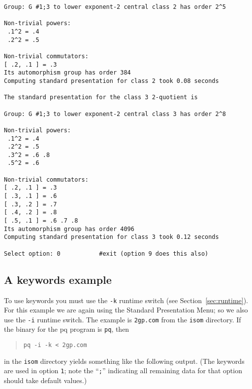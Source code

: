 \documentclass[12pt]{article}
\begin{document}
\begin{verbatim}
Group: G #1;3 to lower exponent-2 central class 2 has order 2^5

Non-trivial powers:
 .1^2 = .4
 .2^2 = .5

Non-trivial commutators:
[ .2, .1 ] = .3
Its automorphism group has order 384
Computing standard presentation for class 2 took 0.08 seconds

The standard presentation for the class 3 2-quotient is

Group: G #1;3 to lower exponent-2 central class 3 has order 2^8

Non-trivial powers:
 .1^2 = .4
 .2^2 = .5
 .3^2 = .6 .8
 .5^2 = .6

Non-trivial commutators:
[ .2, .1 ] = .3
[ .3, .1 ] = .6
[ .3, .2 ] = .7
[ .4, .2 ] = .8
[ .5, .1 ] = .6 .7 .8
Its automorphism group has order 4096
Computing standard presentation for class 3 took 0.12 seconds

Select option: 0           #exit (option 9 does this also)
\end{verbatim}

\subsection{A keywords example}

To use keywords you must use the \texttt{-k} runtime switch
(see Section~\ref{sec:runtime}). For this example we are again
using the Standard Presentation Menu; so we also use the \texttt{-i} runtime
switch. The example is \verb|2gp.com| from the \texttt{isom} directory.
If the binary for the pq program is \texttt{pq}, then
\begin{quote}
 \verb|pq -i -k < 2gp.com|
\end{quote}
in the \texttt{isom} directory yields something like the following output.
(The keywords are used in option \texttt{1}; note the ``\texttt{;}'' 
indicating all remaining data for that option should take default values.)
\end{document}
